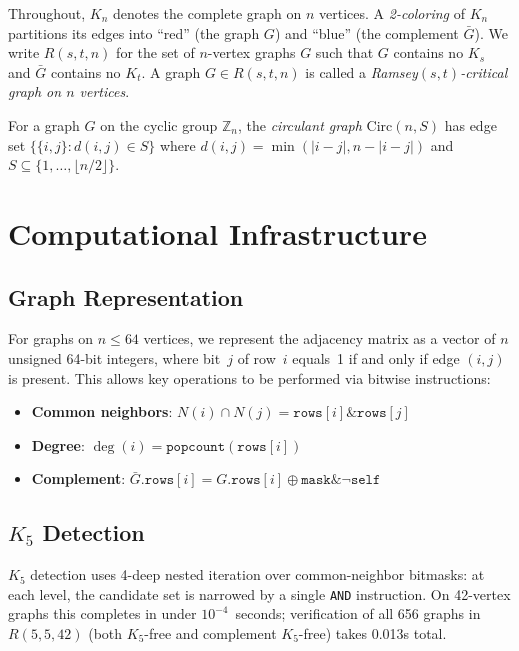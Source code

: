 \documentclass[11pt,a4paper]{article}
\theoremstyle{definition}
\theoremstyle{remark}
\newcommand{\ZZ}{\mathbb{Z}}
\newcommand{\Kn}[1]{K_{#1}}
\newcommand{\Rset}[3]{R(#1,#2,#3)}
\begin{document}
Throughout, $\Kn{n}$ denotes the complete graph on $n$ vertices.
A \emph{2-coloring} of $\Kn{n}$ partitions its edges into
``red'' (the graph $G$) and ``blue'' (the complement $\bar{G}$).
We write $\Rset{s}{t}{n}$ for the set of $n$-vertex graphs $G$
such that $G$ contains no $K_s$ and $\bar{G}$ contains no $K_t$.
A graph $G \in \Rset{s}{t}{n}$ is called a
\emph{Ramsey$(s,t)$-critical graph on $n$ vertices}.

For a graph $G$ on the cyclic group $\ZZ_n$, the
\emph{circulant graph} $\mathrm{Circ}(n, S)$ has edge set
$\{\{i,j\} : d(i,j) \in S\}$ where $d(i,j) = \min(|i-j|, n-|i-j|)$
and $S \subseteq \{1, \ldots, \lfloor n/2 \rfloor\}$.

\section{Computational Infrastructure}
\label{sec:infra}

\subsection{Graph Representation}

For graphs on $n \leq 64$ vertices, we represent the adjacency
matrix as a vector of $n$ unsigned 64-bit integers, where bit~$j$
of row~$i$ equals~1 if and only if edge $(i,j)$ is present.
This allows key operations to be performed via bitwise instructions:

\begin{itemize}
  \item \textbf{Common neighbors}: $N(i) \cap N(j) = \texttt{rows}[i] \mathbin{\&} \texttt{rows}[j]$
  \item \textbf{Degree}: $\deg(i) = \texttt{popcount}(\texttt{rows}[i])$
  \item \textbf{Complement}: $\bar{G}.\texttt{rows}[i] = G.\texttt{rows}[i] \oplus \texttt{mask} \mathbin{\&} \lnot\texttt{self}$
\end{itemize}

\subsection{$K_5$ Detection}

$K_5$ detection uses 4-deep nested iteration over common-neighbor
bitmasks: at each level, the candidate set is narrowed by a single
\texttt{AND} instruction.  On 42-vertex graphs this completes in
under $10^{-4}$~seconds; verification of all 656 graphs in
$\Rset{5}{5}{42}$ (both $K_5$-free and complement $K_5$-free)
takes 0.013s total.
\end{document}

